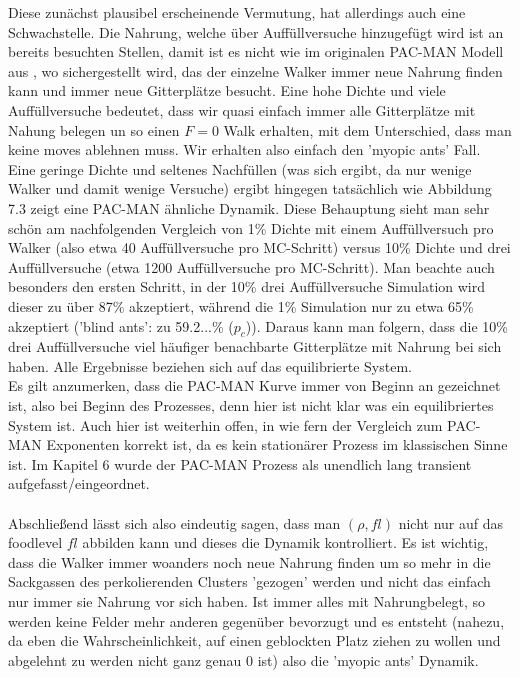 \documentclass[a4paper, 12pt]{report}
\begin{document}
\noindent Diese zunächst plausibel erscheinende Vermutung, hat allerdings auch eine Schwachstelle.  Die Nahrung, welche über Auffüllversuche hinzugefügt wird ist an bereits besuchten Stellen, damit ist es nicht wie im originalen PAC-MAN Modell aus \cite{doi:10.1063/1.4999485}, wo sichergestellt wird, das der einzelne Walker immer neue Nahrung finden kann und immer neue Gitterplätze besucht. Eine hohe Dichte und viele Auffüllversuche bedeutet, dass wir quasi einfach immer alle Gitterplätze mit Nahung belegen un so einen $F=0$ Walk erhalten, mit dem Unterschied, dass man keine moves ablehnen muss. Wir erhalten also einfach den 'myopic ants' Fall. Eine geringe Dichte und seltenes Nachfüllen (was sich ergibt, da nur wenige Walker und damit wenige Versuche) ergibt hingegen tatsächlich wie Abbildung 7.3 zeigt eine PAC-MAN ähnliche Dynamik. Diese Behauptung sieht man sehr schön am nachfolgenden Vergleich von 1\% Dichte mit einem Auffüllversuch pro Walker (also etwa 40 Auffüllversuche pro MC-Schritt) versus 10\% Dichte und drei Auffüllversuche (etwa 1200 Auffüllversuche pro MC-Schritt). Man beachte auch besonders den ersten Schritt, in der 10\% drei Auffüllversuche Simulation wird dieser zu über 87\% akzeptiert, während die 1\% Simulation nur zu etwa 65\% akzeptiert ('blind ants': zu 59.2...\% ($p_c$)). Daraus kann man folgern, dass die 10\% drei Auffüllversuche viel häufiger benachbarte Gitterplätze mit Nahrung bei sich haben. Alle Ergebnisse beziehen sich auf das equilibrierte System.
\\
Es gilt anzumerken, dass die PAC-MAN Kurve immer von Beginn an gezeichnet ist, also bei Beginn des Prozesses, denn hier ist nicht klar was ein equilibriertes System ist. Auch hier ist weiterhin offen, in wie fern der Vergleich zum PAC-MAN Exponenten korrekt ist, da es kein stationärer Prozess im klassischen Sinne ist. Im Kapitel 6 wurde der PAC-MAN Prozess als unendlich lang transient aufgefasst/eingeordnet.
\\
\\
Abschließend lässt sich also eindeutig sagen, dass man $(\rho,fl)$ nicht nur auf das foodlevel $fl$ abbilden kann und dieses die Dynamik kontrolliert. Es ist wichtig, dass die Walker immer woanders noch neue Nahrung finden um so mehr in die Sackgassen des perkolierenden Clusters 'gezogen' werden und nicht das einfach nur immer sie Nahrung vor sich haben. Ist immer alles mit Nahrungbelegt, so werden keine Felder mehr anderen gegenüber bevorzugt und es entsteht (nahezu, da eben die Wahrscheinlichkeit, auf einen geblockten Platz ziehen zu wollen und abgelehnt zu werden nicht ganz genau 0 ist) also die 'myopic ants' Dynamik.
\end{document}

